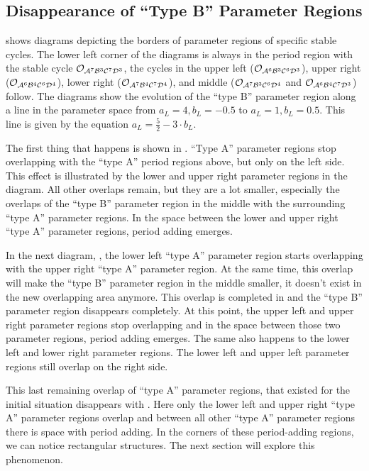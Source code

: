 
\subsection{Disappearance of ``Type B'' Parameter Regions}
\label{sec:minrep.adding.disapp.typeB}

 shows diagrams depicting the borders of parameter regions of specific stable cycles.
The lower left corner of the diagrams is always in the period region with the stable cycle $\mathcal{O}_{\mathcal{A}^7\mathcal{B}^3\mathcal{C}^7\mathcal{D}^3}$, the cycles in the upper left ($\mathcal{O}_{\mathcal{A}^6\mathcal{B}^3\mathcal{C}^6\mathcal{D}^3}$), upper right ($\mathcal{O}_{\mathcal{A}^6\mathcal{B}^4\mathcal{C}^6\mathcal{D}^4}$), lower right ($\mathcal{O}_{\mathcal{A}^7\mathcal{B}^4\mathcal{C}^7\mathcal{D}^4}$), and middle ($\mathcal{O}_{\mathcal{A}^7\mathcal{B}^3\mathcal{C}^6\mathcal{D}^4}$ and $\mathcal{O}_{\mathcal{A}^6\mathcal{B}^4\mathcal{C}^7\mathcal{D}^3}$) follow.
The diagrams show the evolution of the ``type B'' parameter region along a line in the parameter space from $a_L = 4, b_L = -0.5$ to $a_L = 1, b_L = 0.5$.
This line is given by the equation $a_L = \frac{5}{2} - 3 \cdot b_L$.

The first thing that happens is shown in .
``Type A'' parameter regions stop overlapping with the ``type A'' period regions above, but only on the left side.
This effect is illustrated by the lower and upper right parameter regions in the diagram.
All other overlaps remain, but they are a lot smaller, especially the overlaps of the ``type B'' parameter region in the middle with the surrounding ``type A'' parameter regions.
In the space between the lower and upper right ``type A'' parameter regions, period adding emerges.

In the next diagram, , the lower left ``type A'' parameter region starts overlapping with the upper right ``type A'' parameter region.
At the same time, this overlap will make the ``type B'' parameter region in the middle smaller, it doesn't exist in the new overlapping area anymore.
This overlap is completed in  and the ``type B'' parameter region disappears completely.
At this point, the upper left and upper right parameter regions stop overlapping and in the space between those two parameter regions, period adding emerges.
The same also happens to the lower left and lower right parameter regions.
The lower left and upper left parameter regions still overlap on the right side.

This last remaining overlap of ``type A'' parameter regions, that existed for the initial situation disappears with .
Here only the lower left and upper right ``type A'' parameter regions overlap and between all other ``type A'' parameter regions there is space with period adding.
In the corners of these period-adding regions, we can notice rectangular structures.
The next section will explore this phenomenon.



